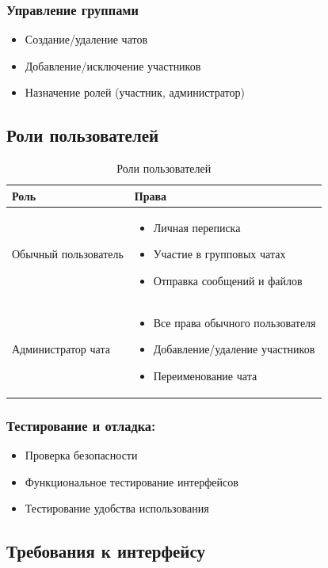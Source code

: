 \subsubsection{Управление группами}
\begin{itemize}
	\item Создание/удаление чатов
	\item Добавление/исключение участников
	\item Назначение ролей (участник, администратор)
\end{itemize}

\subsection{Роли пользователей}

\begin{xltabular}{\textwidth}{|l|X|}
	\caption{Роли пользователей}\label{tab:roles} \\ \hline
	\centrow Роль & \centrow Права \\ \hline
	\endfirsthead
	Обычный пользователь & 
	\begin{itemize}
		\item Личная переписка
		\item Участие в групповых чатах
		\item Отправка сообщений и файлов
	\end{itemize} \\ \hline
	Администратор чата & 
	\begin{itemize}
		\item Все права обычного пользователя
		\item Добавление/удаление участников
		\item Переименование чата
	\end{itemize} \\ \hline
\end{xltabular}

\subsubsection {Тестирование и отладка:}
\begin{itemize}
    \item Проверка безопасности
	\item Функциональное тестирование интерфейсов
	\item Тестирование удобства использования
\end{itemize}
\newpage
\subsection{Требования к интерфейсу}

